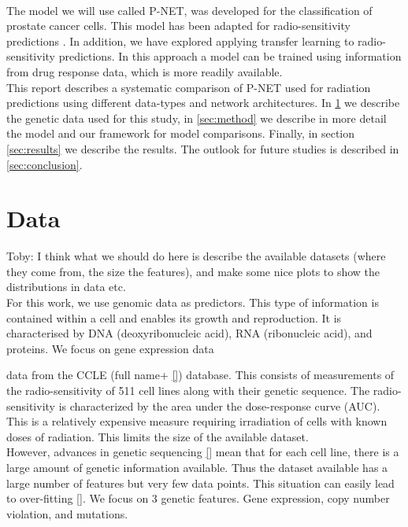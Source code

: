 \documentclass[NOTE, disdraft=true, UKenglish]{\DISCDTLATEXPATH UCLCDTDISdoc}
\begin{document}
\\ \indent 
The model we will use called P-NET\cite{elmarakeby_biologically_2021}, was developed for the classification of prostate cancer cells. This model has been adapted for radio-sensitivity predictions \cite{cosmin_thesis}. In addition, we have explored applying transfer learning \cite{transfer} to radio-sensitivity predictions. In this approach a model can be trained using information from drug response data, which is more readily available.
\\ \indent 
This report describes a systematic comparison of P-NET used for radiation predictions using different data-types and network architectures. 
In \ref{sec:data} we describe the genetic data used for this study, in \ref{sec:method} we describe in more detail the model and our framework for model comparisons. Finally, in section \ref{sec:results} we describe the results. The outlook for future studies is described in \ref{sec:conclusion}.
 
%
\section{Data}
\label{sec:data}
{\color{red}Toby: I think what we should do here is describe the available datasets (where they come from, the size the features), and make some nice plots to show the distributions in data etc.}
\\
For this work, we use genomic data as predictors. This type of information is contained within a cell and enables its growth and reproduction. It is characterised by DNA (deoxyribonucleic acid), RNA (ribonucleic acid), and proteins. We focus on gene expression data


data from the CCLE (full name+ \ref{}) database. This consists of measurements of the radio-sensitivity of 511 cell lines along with their genetic sequence. The radio-sensitivity is characterized by the area under the dose-response curve (AUC). This is a relatively expensive measure requiring irradiation of cells with known doses of radiation. This limits the size of the available dataset. 
\\ \indent However, advances in genetic sequencing \ref{} mean that for each cell line, there is a large amount of genetic information available. Thus the dataset available has a large number of features but very few data points. This situation can easily lead to over-fitting \ref{}. We focus on 3 genetic features. Gene expression, copy number violation, and mutations.
\end{document}
